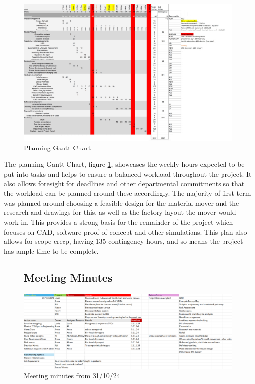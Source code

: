 \documentclass[12pt]{article}
\begin{document}
\begin{figure}
    \centering
    \includegraphics[width=1\linewidth]{Gantt plan final.jpg}
    \caption{Planning Gantt Chart}
    \label{fig:y}
\end{figure}
The planning Gantt Chart, figure \ref{fig:y}, showcases the weekly hours expected to be put into tasks and helps to ensure a balanced workload throughout the project. It also allows foresight for deadlines and other departmental commitments so that the workload can be planned around these accordingly. The majority of first term was planned around choosing a feasible design for the material mover and the research and drawings for this, as well as the factory layout the mover would work in. This provides a strong basis for the remainder of the project which focuses on CAD, software proof of concept and other simulations. This plan also allows for scope creep, having 135 contingency hours, and so means the project has ample time to be complete. 

\begin{figure}[h!]
 \subsection{Meeting Minutes}
    \includegraphics[width=1\textwidth]{HalloweenMinutes1.png}
    \caption{Meeting minutes from 31/10/24}
    \label{fig:x}
\end{figure}
  
\end{document}
